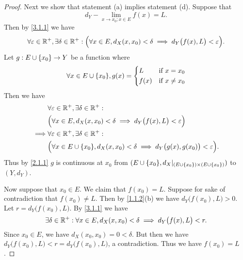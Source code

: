 \begin{proof}
  Next we show that statement (a) implies statement (d).
  Suppose that
  \[
    d_Y - \lim_{x \to x_0 ; x \in E} f(x) = L.
  \]
  Then by \cref{3.1.1} we have
  \[
    \forall \varepsilon \in \mathbb{R}^+, \exists \delta \in \mathbb{R}^+ : \Big(\forall x \in E, d_X(x, x_0) < \delta \implies d_Y\big(f(x), L\big) < \varepsilon\Big).
  \]
  Let \(g : E \cup \left\lbrace x_0\right\rbrace \to Y\) be a function where
  \[
    \forall x \in E \cup \set{x_0}, g(x) = \begin{dcases}
      L    & \text{if } x = x_0    \\
      f(x) & \text{if } x \neq x_0
    \end{dcases}
  \]
  Then we have
  \begin{align*}
             & \forall \varepsilon \in \R^+, \exists \delta \in \R^+ :                                                          \\
             & \Big(\forall x \in E, d_X(x, x_0) < \delta \implies d_Y\big(f(x), L\big) < \varepsilon\Big)                      \\
    \implies & \forall \varepsilon \in \R^+, \exists \delta \in \R^+ :                                                          \\
             & \Big(\forall x \in E \cup \set{x_0}, d_X(x, x_0) < \delta \implies d_Y\big(g(x), g(x_0)\big) < \varepsilon\Big).
  \end{align*}
  Thus by \cref{2.1.1} \(g\) is continuous at \(x_0\) from \((E \cup \set{x_0}, d_X|_{(E \cup \set{x_0}) \times (E \cup \set{x_0})})\) to \((Y, d_Y)\).

  Now suppose that \(x_0 \in E\).
  We claim that \(f(x_0) = L\).
  Suppose for sake of contradiction that \(f(x_0) \neq L\).
  Then by \cref{1.1.2}(b) we have \(d_Y\big(f(x_0), L\big) > 0\).
  Let \(r = d_Y\big(f(x_0), L\big)\).
  By \cref{3.1.1} we have
  \[
    \exists \delta \in \mathbb{R}^+ : \forall x \in E, d_X(x, x_0) < \delta \implies d_Y\big(f(x), L\big) < r.
  \]
  Since \(x_0 \in E\), we have \(d_X(x_0, x_0) = 0 < \delta\).
  But then we have \(d_Y\big(f(x_0), L\big) < r = d_Y\big(f(x_0), L\big)\), a contradiction.
  Thus we have \(f(x_0) = L\).


\end{proof}
